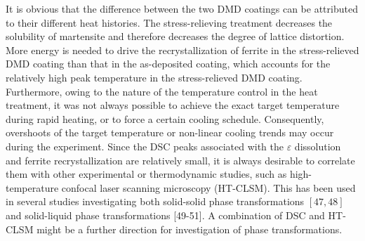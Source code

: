 \documentclass[10pt]{article}
\begin{document}
It is obvious that the difference between the two DMD coatings can be attributed to their different heat histories. The stress-relieving treatment decreases the solubility of martensite and therefore decreases the degree of lattice distortion. More energy is needed to drive the recrystallization of ferrite in the stress-relieved DMD coating than that in the as-deposited coating, which accounts for the relatively high peak temperature in the stress-relieved DMD coating. Furthermore, owing to the nature of the temperature control in the heat treatment, it was not always possible to achieve the exact target temperature during rapid heating, or to force a certain cooling schedule. Consequently, overshoots of the target temperature or non-linear cooling trends may occur during the experiment. Since the DSC peaks associated with the $\varepsilon$ dissolution and ferrite recrystallization are relatively small, it is always desirable to correlate them with other experimental or thermodynamic studies, such as high-temperature confocal laser scanning microscopy (HT-CLSM). This has been used in several studies investigating both solid-solid phase transformations $[47,48]$ and solid-liquid phase transformations [49-51]. A combination of DSC and HT-CLSM might be a further direction for investigation of phase transformations.
\end{document}
